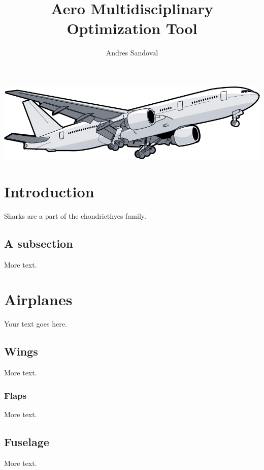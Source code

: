 \documentclass[11pt]{article} %
\title{Aero Multidisciplinary Optimization Tool}
\author{Andres Sandoval}
\begin{document}
\maketitle
\begin{center}
    \includegraphics[width=1.1\textwidth]{cover}
\end{center}

\pagebreak

\tableofcontents
 
\pagebreak

\section{Introduction}

Sharks are a part of the chondricthyes family.

\subsection{A subsection}

More text.

\section{Airplanes}

Your text goes here.

\subsection{Wings}

More text.

\subsubsection{Flaps}

More text.

\subsection{Fuselage}

More text.
\end{document}
